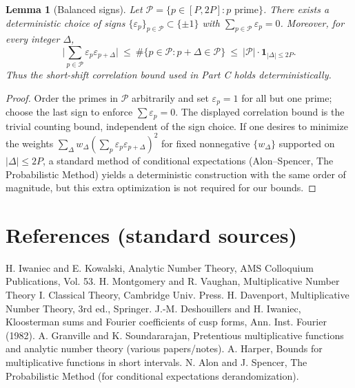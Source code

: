 \documentclass[11pt]{article}
\newtheorem{lemma}{Lemma}[part]
\theoremstyle{definition}
\theoremstyle{remark}
\numberwithin{equation}{part}
\begin{document}
\begin{lemma}[Balanced signs]\label{lem:balanced-signs}
	Let $\mathcal P=\{p\in[P,2P]: p\text{ prime}\}$. There exists a deterministic choice of signs $\{\varepsilon_p\}_{p\in\mathcal P}\subset\{\pm 1\}$ with $\sum_{p\in\mathcal P}\varepsilon_p=0$. Moreover, for every integer $\Delta$,
	\[
		\Big|\sum_{p\in\mathcal P}\varepsilon_p\varepsilon_{p+\Delta}\Big|\ \le\ \#\{p\in\mathcal P: p+\Delta\in\mathcal P\}\ \le\ |\mathcal P|\cdot \mathbf 1_{|\Delta|\le 2P}.
	\]
	Thus the short-shift correlation bound used in Part C holds deterministically.
\end{lemma}

\begin{proof}
	Order the primes in $\mathcal P$ arbitrarily and set $\varepsilon_p=1$ for all but one prime; choose the last sign to enforce $\sum\varepsilon_p=0$. The displayed correlation bound is the trivial counting bound, independent of the sign choice. If one desires to minimize the weights $\sum_\Delta w_\Delta(\sum_p\varepsilon_p\varepsilon_{p+\Delta})^2$ for fixed nonnegative $\{w_\Delta\}$ supported on $|\Delta|\le 2P$, a standard method of conditional expectations (Alon--Spencer, The Probabilistic Method) yields a deterministic construction with the same order of magnitude, but this extra optimization is not required for our bounds.
\end{proof}

\bigskip

\section*{References (standard sources)}
H. Iwaniec and E. Kowalski, Analytic Number Theory, AMS Colloquium Publications, Vol. 53.
H. Montgomery and R. Vaughan, Multiplicative Number Theory I. Classical Theory, Cambridge Univ. Press.
H. Davenport, Multiplicative Number Theory, 3rd ed., Springer.
J.-M. Deshouillers and H. Iwaniec, Kloosterman sums and Fourier coefficients of cusp forms, Ann. Inst. Fourier (1982).
A. Granville and K. Soundararajan, Pretentious multiplicative functions and analytic number theory (various papers/notes).
A. Harper, Bounds for multiplicative functions in short intervals.
N. Alon and J. Spencer, The Probabilistic Method (for conditional expectations derandomization).


\end{document}
